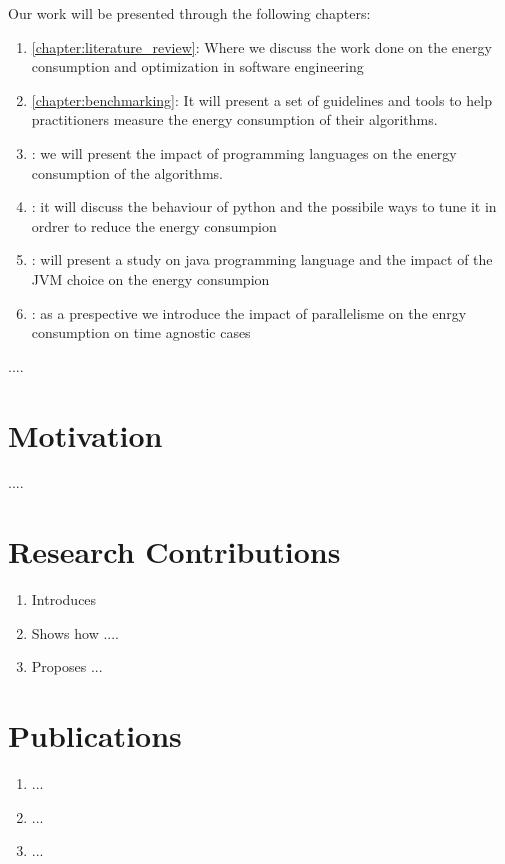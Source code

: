 Our work will be presented through the following chapters:
\begin{enumerate}
    \item \ref{chapter:literature_review}: Where we discuss the work done on the energy consumption and optimization in software engineering
    \item \ref{chapter:benchmarking}: It will present a set of guidelines and tools to help practitioners measure the energy consumption of their algorithms.
    \item : we will present the impact of programming languages on the energy consumption of the algorithms.
    \item : it will discuss the behaviour of python and the possibile ways to tune it in ordrer to reduce the energy consumpion
    \item : will present a study on java programming language and the impact of the JVM choice on the energy consumpion
    \item : as a prespective we introduce the impact of parallelisme on the enrgy consumption on time agnostic cases
\end{enumerate}




....


\section{Motivation}
....


\section{Research Contributions}


\begin{enumerate}

    \item Introduces
    \item Shows how ....
    \item Proposes ...

\end{enumerate}



\section{Publications}

\begin{enumerate}
    \item ...

    \item ...

    \item ...

\end{enumerate}
\cleardoublepage
